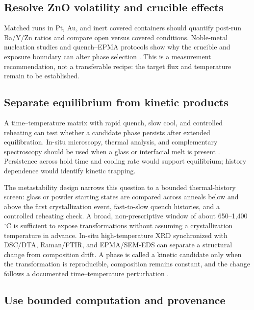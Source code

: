 \subsection{Resolve ZnO volatility and crucible effects}

Matched runs in Pt, Au, and inert covered containers should quantify post-run Ba\slash Y\slash Zn ratios and compare open versus covered conditions. Noble-metal nucleation studies and quench--EPMA protocols show why the crucible and exposure boundary can alter phase selection \cite{thieme2022noble,abdeyazdan2024phase,abdeyazdan2023experimental}. This is a measurement recommendation, not a transferable recipe: the target flux and temperature remain to be established.

\subsection{Separate equilibrium from kinetic products}

A time--temperature matrix with rapid quench, slow cool, and controlled reheating can test whether a candidate phase persists after extended equilibration. In-situ microscopy, thermal analysis, and complementary spectroscopy should be used when a glass or interfacial melt is present \cite{mckenzie2020nucleation,bocker2012in,mastelaro2018x,wang2024optimal}. Persistence across hold time and cooling rate would support equilibrium; history dependence would identify kinetic trapping.

The metastability design narrows this question to a bounded thermal-history
screen: glass or powder starting states are compared across anneals below and
above the first crystallization event, fast-to-slow quench histories, and a
controlled reheating check. A broad, non-prescriptive window of about
650--1,400~$^{\circ}$C is sufficient to expose transformations without
assuming a crystallization temperature in advance. In-situ high-temperature
XRD synchronized with DSC\slash DTA, Raman\slash FTIR, and EPMA\slash SEM-EDS can separate a
structural change from composition drift. A phase is called a kinetic candidate
only when the transformation is reproducible, composition remains constant, and
the change follows a documented time--temperature perturbation
\cite{dingwell1990relaxation,mckenzie2021nucleation,zeng2024selective,wang2024optimal}.

\subsection{Use bounded computation and provenance}

